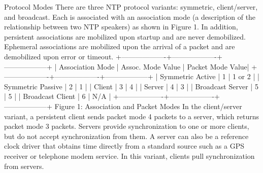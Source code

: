 Protocol Modes
 There are three NTP protocol variants: symmetric, client/server, and
 broadcast. Each is associated with an association mode (a
 description of the relationship between two NTP speakers) as shown in
 Figure 1. In addition, persistent associations are mobilized upon
 startup and are never demobilized. Ephemeral associations are
 mobilized upon the arrival of a packet and are demobilized upon error
 or timeout.
 +-------------------+-------------------+------------------+
 | Association Mode | Assoc. Mode Value | Packet Mode Value|
 +-------------------+-------------------+------------------+
 | Symmetric Active | 1 | 1 or 2 |
 | Symmetric Passive | 2 | 1 |
 | Client | 3 | 4 |
 | Server | 4 | 3 |
 | Broadcast Server | 5 | 5 |
 | Broadcast Client | 6 | N/A |
 +-------------------+-------------------+------------------+
 Figure 1: Association and Packet Modes
 In the client/server variant, a persistent client sends packet mode 4
 packets to a server, which returns packet mode 3 packets. Servers
 provide synchronization to one or more clients, but do not accept
 synchronization from them. A server can also be a reference clock
 driver that obtains time directly from a standard source such as a
 GPS receiver or telephone modem service. In this variant, clients
 pull synchronization from servers.

